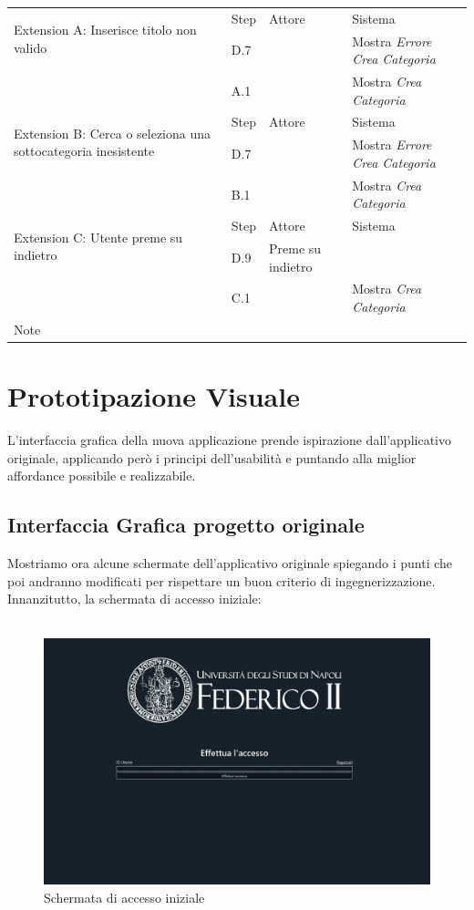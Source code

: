  \begin{table}[H]
\def\arraystretch{1.5}
\begin{tabularx}{\linewidth}{|l|X|X|X|}
 
 \hline \multirow{2}{6cm}{Extension A: Inserisce titolo non valido} & Step &
  Attore & Sistema \\
 \cline{2-4} & D.7 & & Mostra \textit{Errore Crea Categoria} \\
  \cline{2-4} & A.1 & & Mostra \textit{Crea Categoria}\\
 \hline
  \multirow{2}{6cm}{Extension B: Cerca o seleziona una sottocategoria inesistente} & Step & Attore & Sistema \\
 \cline{2-4} & D.7 & & Mostra \textit{Errore Crea Categoria} \\
  \cline{2-4} & B.1 & & Mostra \textit{Crea Categoria}\\
 \hline 
   \multirow{2}{6cm}{Extension C: Utente preme su indietro} & Step & Attore & Sistema \\
 \cline{2-4} & D.9 & Preme su indietro &  \\
  \cline{2-4} & C.1 & & Mostra \textit{Crea Categoria}\\
 \hline Note & \multicolumn{3}{l|}{} \\
 \hline


\end{tabularx}
\end{table}
\newpage

\raggedright{\section{Prototipazione Visuale}}
L'interfaccia grafica della nuova applicazione prende ispirazione dall'applicativo originale, applicando però i principi dell'usabilità e puntando alla miglior affordance possibile e realizzabile.

\raggedright{\subsection{Interfaccia Grafica progetto originale}}
Mostriamo ora alcune schermate dell'applicativo originale spiegando i punti che poi andranno modificati per rispettare un buon criterio di ingegnerizzazione. \\ Innanzitutto, la schermata di accesso iniziale:  
\\~\\
\begin{figure}[H]
    \centering
            \includegraphics[width=.60\textwidth]{Immagini/VecchioProgetto/login.jpg}
    \caption{Schermata di accesso iniziale}
\end{figure}

